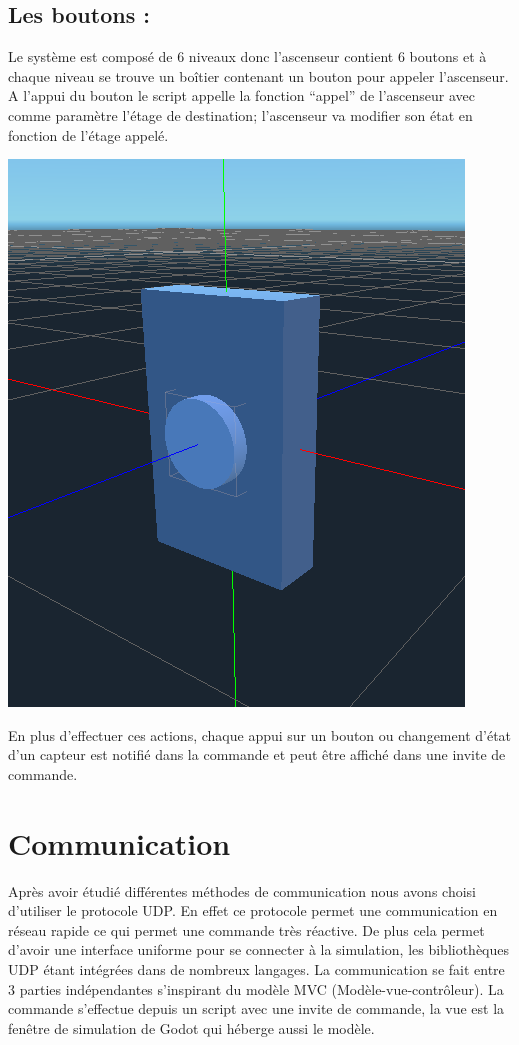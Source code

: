 \documentclass[12pt]{article}
\begin{document}
\subsection{Les boutons :}
\newline
Le système est composé de 6 niveaux donc l’ascenseur contient 6 boutons et à chaque niveau se trouve un boîtier contenant un bouton pour appeler l’ascenseur. A l’appui du bouton le script appelle la fonction “appel” de l’ascenseur avec comme paramètre l’étage de destination; l’ascenseur va modifier son état en fonction de l’étage appelé.
\newline
\begin{center}\includegraphics[scale=0.4]{bouton.PNG}\end{center}
\newline
En plus d’effectuer ces actions, chaque appui sur un bouton ou changement d’état d’un capteur est notifié dans la commande et peut être affiché dans une invite de commande.

\newpage
\section{Communication}

Après avoir étudié différentes méthodes de communication nous avons choisi d’utiliser le protocole UDP. En effet ce protocole permet une communication en réseau rapide ce qui permet une commande très réactive. De plus cela permet d’avoir une interface uniforme pour se connecter à la simulation, les bibliothèques UDP étant intégrées dans de nombreux langages. 
\newline
\newline
La communication se fait entre 3 parties indépendantes s’inspirant du modèle MVC (Modèle-vue-contrôleur). La commande s’effectue depuis un script avec une invite de commande, la vue est la fenêtre de simulation de Godot qui héberge aussi le modèle.
\end{document}
